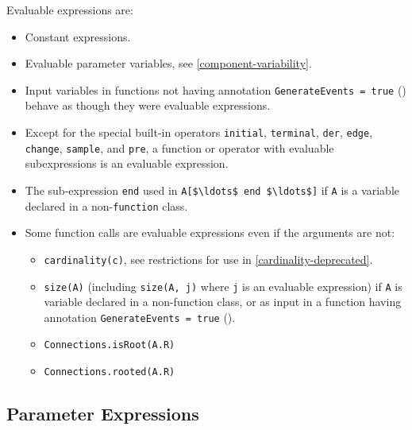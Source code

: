 Evaluable expressions are:
\begin{itemize}
\item
  Constant expressions.
\item
  Evaluable parameter variables, see \cref{component-variability}.
\item
  Input variables in functions not having annotation \lstinline!GenerateEvents = true! () behave as though they were evaluable expressions.
\item
  Except for the special built-in operators \lstinline!initial!, \lstinline!terminal!, \lstinline!der!, \lstinline!edge!, \lstinline!change!, \lstinline!sample!, and \lstinline!pre!, a function or operator with evaluable subexpressions is an evaluable expression.
\item
  The sub-expression \lstinline!end! used in \lstinline!A[$\ldots$ end $\ldots$]! if \lstinline!A! is a variable declared in a non-\lstinline!function! class.
\item
  Some function calls are evaluable expressions even if the arguments are not:
  \begin{itemize}
  \item
    \lstinline!cardinality(c)!, see restrictions for use in \cref{cardinality-deprecated}.
  \item
    \lstinline!size(A)! (including \lstinline!size(A, j)! where \lstinline!j! is an evaluable expression) if \lstinline!A! is variable declared in a non-function class, or as input in a function having annotation \lstinline!GenerateEvents = true! ().
  \item
    \lstinline!Connections.isRoot(A.R)!
  \item
    \lstinline!Connections.rooted(A.R)!
  \end{itemize}
\end{itemize}

\subsection{Parameter Expressions}\label{parameter-expressions}


